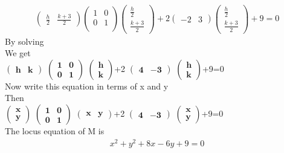 \documentclass[10pt,a4paper]{report}
\let\vec\mathbf
\begin{document}
\begin{multicols}{2}
\begin{align}
\begin{pmatrix}
\frac{h}{2} & \frac{k+3}{2} 
\end{pmatrix} 
\begin{pmatrix}
1 & 0\\ 0 & 1 \\
\end{pmatrix}
\begin{pmatrix}
\frac{h}{2} \\ \frac{k+3}{2} 
\end{pmatrix}+2
\begin{pmatrix}
-2 & 3
\end{pmatrix}
\begin{pmatrix}
\frac{h}{2} \\ \frac{k+3}{2} 
\end{pmatrix}+9=0
\end{align}
By solving 
\vspace{0.25cm}\\
We get
\vspace{0.25cm}\\
$\vec{ \begin{pmatrix}h & k \end{pmatrix}}$
$\vec{ \begin{pmatrix}1 & 0 \\ 0 & 1 \end{pmatrix}}$
$\vec{ \begin{pmatrix}h \\ k \end{pmatrix}}$+2
$\vec{ \begin{pmatrix}4 & -3 \end{pmatrix}}$
$\vec{ \begin{pmatrix}h \\ k \end{pmatrix}}$+9=0
\vspace{0.25cm}\\
Now write this equation in terms of x and y
\vspace{0.25cm}\\
Then
\vspace{0.25cm}\\
$\vec{ \begin{pmatrix}x \\ y \end{pmatrix}}$
$\vec{ \begin{pmatrix}1 & 0 \\ 0 & 1 \end{pmatrix}}$
$\vec{ \begin{pmatrix}x & y \end{pmatrix}}$+2
$\vec{ \begin{pmatrix}4 & -3 \end{pmatrix}}$
$\vec{ \begin{pmatrix}x \\ y \end{pmatrix}}$+9=0
\\
The locus equation of M is
\begin{align}
\boxed {x^2+y^2+8x-6y+9=0}
\end{align}
\end{multicols}
\end{document}
